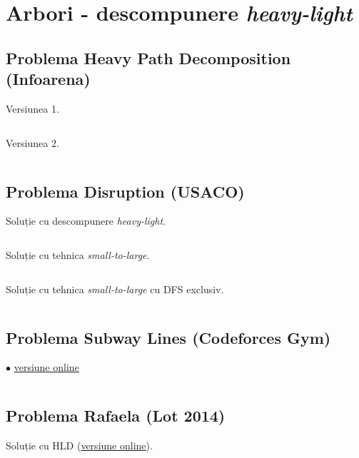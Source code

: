 \documentclass[../main.tex]{subfiles}
\begin{document}
\chapter{Arbori - descompunere \textit{heavy-light}}

\section{Problema Heavy Path Decomposition (Infoarena)}
\label{code:heavy-path-decomposition}

Versiunea 1.

\inputminted{cpp}{../src/trees/heavy-light-decomposition-1.cpp}

Versiunea 2.

\inputminted{cpp}{../src/trees/heavy-light-decomposition-2.cpp}

\section{Problema Disruption (USACO)}
\label{code:disruption}

Soluție cu descompunere \textit{heavy-light}.

\inputminted{cpp}{../src/trees/disruption-hld.cpp}

Soluție cu tehnica \textit{small-to-large}.

\inputminted{cpp}{../src/trees/disruption-small-to-large.cpp}

Soluție cu tehnica \textit{small-to-large} cu DFS exclusiv.

\inputminted{cpp}{../src/trees/disruption-exclusive-small-to-large.cpp}

\section{Problema Subway Lines (Codeforces Gym)}
\label{code:subway-lines}
$\bullet$
\href{https://codeforces.com/gym/101908/submission/373719377}{versiune online}

\inputminted{cpp}{../src/trees/subway-lines.cpp}

\section{Problema Rafaela (Lot 2014)}
\label{code:rafaela}

Soluție cu HLD (\href{https://kilonova.ro/submissions/515571}{versiune online}).
\end{document}
